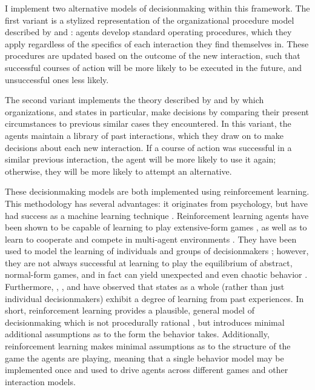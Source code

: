 I implement two alternative models of decisionmaking within this framework. The first variant is a stylized representation of the organizational procedure model described by \citet{allison_1999} and \citet{levy_1986}: agents develop standard operating procedures, which they apply regardless of the specifics of each interaction they find themselves in. These procedures are updated based on the outcome of the new interaction, such that successful courses of action will be more likely to be executed in the future, and unsuccessful ones less likely.

The second variant implements the theory described by \citet{march_1993} and \citet{khong_1992} by which organizations, and states in particular, make decisions by comparing their present circumstances to previous similar cases they encountered. In this variant, the agents maintain a library of past interactions, which they draw on to make decisions about each new interaction. If a course of action was successful in a similar previous interaction, the agent will be more likely to use it again; otherwise, they will be more likely to attempt an alternative.

These decisionmaking models are both implemented using reinforcement learning. This methodology has several advantages: it originates from psychology, but have had success as a machine learning technique \citep{sutton_1998}. Reinforcement learning agents have been shown to be capable of learning to play extensive-form games \citep{laslier_2005,akramizadeh_2009}, as well as to learn to cooperate and compete in multi-agent environments \citep{littman_1994,claus_1998}. They have been used to model the learning of individuals and groups of decisionmakers \citep{kocher_2005}; however, they are not always successful at learning to play the equilibrium of abstract, normal-form games, and in fact can yield unexpected and even chaotic behavior \citep{galla_2013}. Furthermore, \citet{khong_1992}, \citet{allison_1999}, and \citet{cederman_2001} have observed that states as a whole (rather than just individual decisionmakers) exhibit a degree of learning from past experiences. In short, reinforcement learning provides a plausible, general model of decisionmaking which is not procedurally rational \citep{simon_1976}, but introduces minimal additional assumptions as to the form the behavior takes. Additionally, reinforcement learning makes minimal assumptions as to the structure of the game the agents are playing, meaning that a single behavior model may be implemented once and used to drive agents across different games and other interaction models. %


